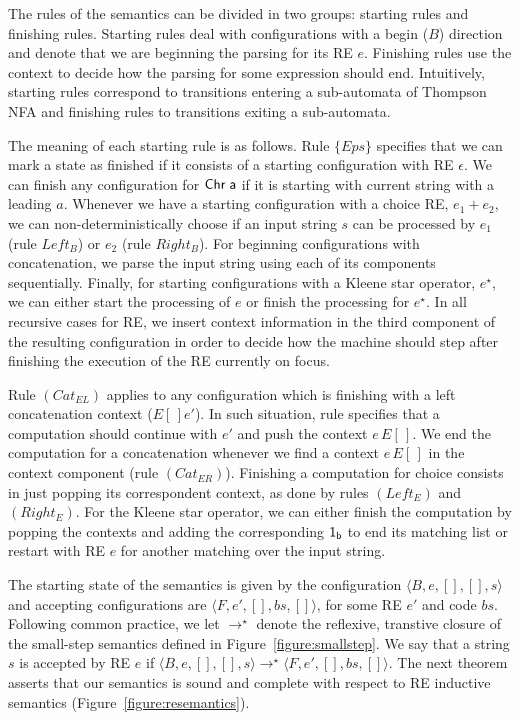 \documentclass[sigplan]{acmart}
\theoremstyle{definition}
\newcommand{\C}[1]{\red{\mathsf{#1}}}
\newcommand{\V}[1]{\black{\mathsf{#1}}}
\newcommand{\conf}[1]{\ensuremath{\langle #1 \rangle}}
\begin{document}
The rules of the semantics can be divided in two groups: starting rules and finishing rules.
Starting rules deal with configurations with a begin ($B$) direction and denote that we are
beginning the parsing for its RE $e$. Finishing rules use the context to decide how the parsing
for some expression should end. Intuitively, starting rules correspond to transitions entering a
sub-automata of Thompson NFA and finishing rules to transitions exiting a sub-automata.

The meaning of each starting rule is as follows. Rule $\{Eps\}$ specifies that we can mark a state as
finished if it consists of a starting configuration with RE $\epsilon$. We can finish any configuration
for \ensuremath{\C{Chr}\;\V{a}} if it is starting with current string with a leading $a$. Whenever we have a starting configuration
with a choice RE, $e_1 + e_2$, we can non-deterministically choose if an input string $s$ can be processed by
$e_1$ (rule $Left_B$) or $e_2$ (rule $Right_B$). For beginning configurations with concatenation, we parse
the input string using each of its components sequentially. Finally, for starting configurations with a Kleene
star operator, $e^\star$, we can either start the processing of $e$ or finish the processing for $e^\star$.
In all recursive cases for RE, we insert context information in the third component of the resulting
configuration in order to decide how the machine should step after finishing the execution of the RE
currently on focus.

Rule $(Cat_{EL})$ applies to any configuration which is finishing with a left concatenation context ($E[\,]e'$).
In such situation, rule specifies that a computation should continue with $e'$ and push the context $e\,E[\,]$.
We end the computation for a concatenation whenever we find a context $e\,E[\,]$ in the context component
(rule $(Cat_{ER})$). Finishing a computation for choice consists in just popping its correspondent context,
as done by rules $(Left_E)$ and $(Right_E)$. For the Kleene star operator, we can either finish the computation
by popping the contexts and adding the corresponding \ensuremath{\C{1_b}} to end its matching list or restart with RE $e$ for
another matching over the input string.

The starting state of the semantics is given by the configuration
$\conf{B,e,[],[],s}$ and accepting configurations are $\conf{F,e',[],bs,[]}$, for some RE $e'$ and code $bs$.
Following common practice, we let $\to^\star$ denote the reflexive, transtive closure of the small-step
semantics defined in Figure~\ref{figure:smallstep}.
We say that a string $s$ is accepted by RE $e$ if $\conf{B,e,[],[],s}\to^\star\conf{F,e',[],bs,[]}$.
The next theorem asserts that our semantics is sound and complete with respect to RE
inductive semantics (Figure~\ref{figure:resemantics}).
\end{document}
